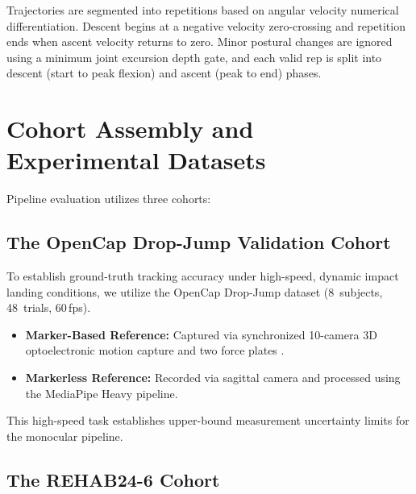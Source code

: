 Trajectories are segmented into repetitions based on angular velocity numerical differentiation. Descent begins at a negative velocity zero-crossing and repetition ends when ascent velocity returns to zero. Minor postural changes are ignored using a minimum joint excursion depth gate, and each valid rep is split into descent (start to peak flexion) and ascent (peak to end) phases.


\section{Cohort Assembly and Experimental Datasets}
\label{sec:cohorts}

Pipeline evaluation utilizes three cohorts:

\subsection{The OpenCap Drop-Jump Validation Cohort}
\label{sec:opencap-cohort}

To establish ground-truth tracking accuracy under high-speed, dynamic impact landing conditions, we utilize the OpenCap Drop-Jump dataset (8~subjects, 48~trials, 60\,fps).
\begin{itemize}
  \item \textbf{Marker-Based Reference:} Captured via synchronized 10-camera 3D optoelectronic motion capture and two force plates \citep{OpenCap_2022}.
  \item \textbf{Markerless Reference:} Recorded via sagittal camera and processed using the MediaPipe Heavy pipeline.
\end{itemize}
This high-speed task establishes upper-bound measurement uncertainty limits for the monocular pipeline.

\subsection{The REHAB24-6 Cohort}
\label{sec:rehab24-cohort}

